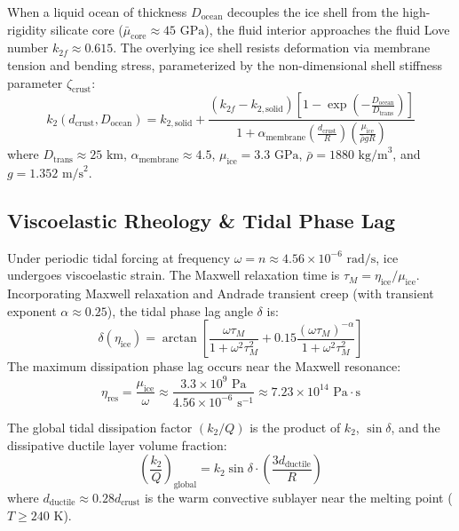 \documentclass[11pt,a4paper]{article}
\begin{document}
When a liquid ocean of thickness $D_{\text{ocean}}$ decouples the ice shell from the high-rigidity silicate core ($\bar{\mu}_{\text{core}} \approx 45\text{ GPa}$), the fluid interior approaches the fluid Love number $k_{2f} \approx 0.615$. The overlying ice shell resists deformation via membrane tension and bending stress, parameterized by the non-dimensional shell stiffness parameter $\zeta_{\text{crust}}$:
\begin{equation}
k_2(d_{\text{crust}}, D_{\text{ocean}}) = k_{2,\text{solid}} + \frac{(k_{2f} - k_{2,\text{solid}}) \left[1 - \exp\left(-\frac{D_{\text{ocean}}}{D_{\text{trans}}}\right)\right]}{1 + \alpha_{\text{membrane}} \left(\frac{d_{\text{crust}}}{R}\right) \left(\frac{\mu_{\text{ice}}}{\bar{\rho} g R}\right)}
\end{equation}
where $D_{\text{trans}} \approx 25\text{ km}$, $\alpha_{\text{membrane}} \approx 4.5$, $\mu_{\text{ice}} = 3.3\text{ GPa}$, $\bar{\rho} = 1880\text{ kg/m}^3$, and $g = 1.352\text{ m/s}^2$. 

\subsection{Viscoelastic Rheology \& Tidal Phase Lag}
Under periodic tidal forcing at frequency $\omega = n \approx 4.56 \times 10^{-6}\text{ rad/s}$, ice undergoes viscoelastic strain. The Maxwell relaxation time is $\tau_M = \eta_{\text{ice}} / \mu_{\text{ice}}$. Incorporating Maxwell relaxation and Andrade transient creep (with transient exponent $\alpha \approx 0.25$), the tidal phase lag angle $\delta$ is:
\begin{equation}
\delta(\eta_{\text{ice}}) = \arctan\left[ \frac{\omega \tau_M}{1 + \omega^2 \tau_M^2} + 0.15 \frac{(\omega \tau_M)^{-\alpha}}{1 + \omega^2 \tau_M^2} \right]
\end{equation}
The maximum dissipation phase lag occurs near the Maxwell resonance:
\begin{equation}
\eta_{\text{res}} = \frac{\mu_{\text{ice}}}{\omega} \approx \frac{3.3 \times 10^9\text{ Pa}}{4.56 \times 10^{-6}\text{ s}^{-1}} \approx 7.23 \times 10^{14}\text{ Pa}\cdot\text{s}
\end{equation}

The global tidal dissipation factor $(k_2 / Q)$ is the product of $k_2$, $\sin \delta$, and the dissipative ductile layer volume fraction:
\begin{equation}
\left(\frac{k_2}{Q}\right)_{\text{global}} = k_2 \sin \delta \cdot \left( \frac{3 d_{\text{ductile}}}{R} \right)
\end{equation}
where $d_{\text{ductile}} \approx 0.28 d_{\text{crust}}$ is the warm convective sublayer near the melting point ($T \ge 240\text{ K}$).
\end{document}
